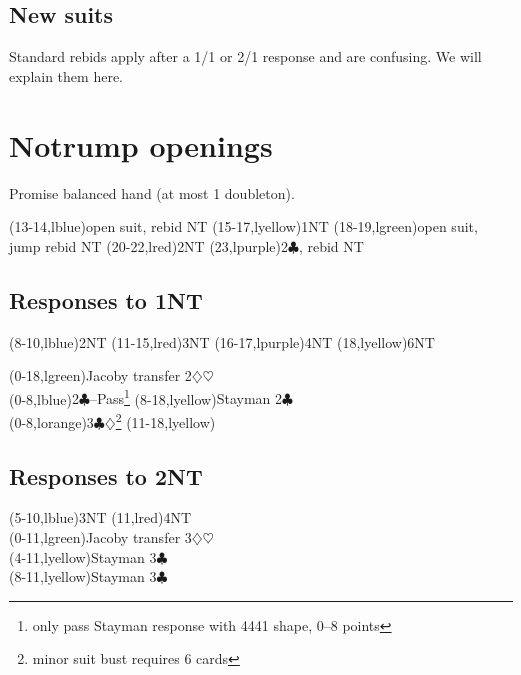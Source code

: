 \documentclass[oneside]{memoir}
\def\C{$\clubsuit$}
\def\D{$\diamondsuit$}
\def\H{$\heartsuit$}
\begin{document}
\section{New suits}
Standard rebids apply after a 1/1 or 2/1 response and are confusing.  We
will explain them here.


\chapter{Notrump openings}

Promise balanced hand (at most 1 doubleton).\\
\begin{ptable}
\row{}
  \bid(13-14,lblue){open suit, rebid NT}
  \bid(15-17,lyellow){1NT}
  \bid(18-19,lgreen){open suit, jump rebid NT}
  \bid(20-22,lred){2NT}
  \bid(23,lpurple){2\C, rebid NT}\\
\end{ptable}

\section{Responses to 1NT}
\begin{ptable}
  \bid(8-10,lblue){2NT}
  \bid(11-15,lred){3NT}
  \bid(16-17,lpurple){4NT}
  \bid(18,lyellow){6NT}\\
\iffalse %
  \bid(0-10,lgreen){Jacoby transfer 2\D\H}
  \bid(11-15,lblue){Texas transfer 4\D\H}
  \bid(16-18,lgreen){2\D\H}\\
\else
  \bid(0-18,lgreen){Jacoby transfer 2\D\H}\\
\fi
{}
  \bid(0-8,lblue){2\C--Pass\footnote{only pass Stayman response with 4441 shape, 0--8 points}}
  \bid*(8-18,lyellow){Stayman 2\C}\\
  \bid(0-8,lorange){3\C\D\footnote{minor suit bust requires 6 cards}}
  \bid(11-18,lyellow){\clift{Stayman 2\C}}\\
\end{ptable}

\section{Responses to 2NT}
\begin{ptable}
  \bid(5-10,lblue){3NT}
  \bid(11,lred){4NT}\\
  \bid(0-11,lgreen){Jacoby transfer 3\D\H}\\
  \bid(4-11,lyellow){Stayman 3\C}\\
  \bid*(8-11,lyellow){Stayman 3\C}\\
\end{ptable}
\end{document}
